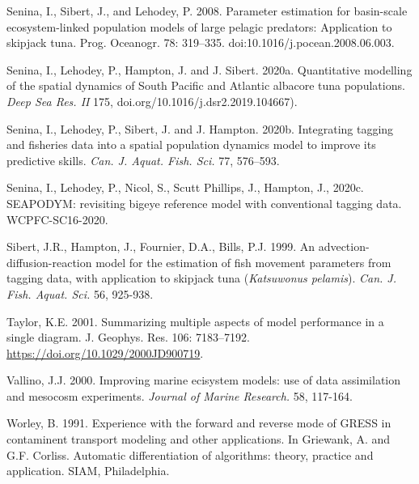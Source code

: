 \begin{thebibliography}{999}
 Senina, I., Sibert, J., and Lehodey, P. 2008. Parameter estimation for basin-scale ecosystem-linked population models of large pelagic predators: Application to skipjack tuna. Prog. Oceanogr. 78: 319–335. doi:10.1016/j.pocean.2008.06.003.


 Senina, I., Lehodey, P., Hampton, J. and J. Sibert. 2020a. Quantitative modelling of the spatial dynamics of South Pacific and Atlantic albacore tuna populations. \textit{Deep Sea Res. II}  175,  doi.org/10.1016/j.dsr2.2019.104667).  

 Senina, I., Lehodey, P., Sibert, J. and J. Hampton. 2020b. Integrating tagging and fisheries data into a spatial population dynamics model to improve its predictive skills. \textit{Can. J. Aquat. Fish. Sci.} 77, 576–593.

 Senina, I., Lehodey, P., Nicol, S., Scutt Phillips, J., Hampton, J., 2020c. SEAPODYM: revisiting bigeye reference model with conventional tagging data. WCPFC-SC16-2020.

 Sibert, J.R., Hampton, J., Fournier, D.A., Bills, P.J. 1999. An advection-diffusion-reaction model for the estimation of fish movement parameters from tagging data, with application to skipjack tuna ({\it Katsuwonus pelamis}). \textit {Can. J. Fish. Aquat. Sci.} 56, 925-938. 


 Taylor, K.E. 2001. Summarizing multiple aspects of model performance in a single diagram. J. Geophys. Res. 106: 7183–7192. \url{https://doi.org/10.1029/2000JD900719}.

 Vallino, J.J. 2000. Improving marine ecisystem models: use of data assimilation and mesocosm experiments. \textit {Journal of Marine Research.} 58, 117-164.

 Worley, B. 1991. Experience with the forward and reverse mode of GRESS in contaminent transport modeling and other applications. In Griewank, A. and G.F. Corliss. Automatic differentiation of algorithms: theory, practice and application. SIAM, Philadelphia.

\end{thebibliography}
